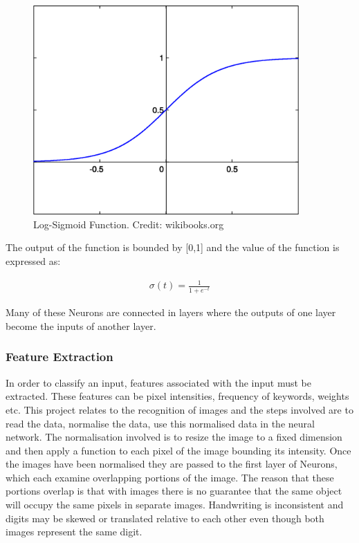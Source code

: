 \documentclass[12pt]{article}
\begin{document}
\begin{figure}[H]
  \centering
  \includegraphics[width=4in]{SigmoidFunction}
  \caption[]{Log-Sigmoid Function. Credit: wikibooks.org}
  \label{SigmoidFunction}
\end{figure}

The output of the function is bounded by [0,1] and the value of the function is expressed as:

\begin{align*}
\sigma(t) = \frac{1}{1 + e^{-t}}
\end{align*}

Many of these Neurons are connected in layers where the outputs of one layer become the inputs of another layer.

\subsubsection{Feature Extraction}
In order to classify an input, features associated with the input must be extracted. These features can be pixel intensities, frequency of keywords, weights etc. This project relates to the recognition of images and the steps involved are to read the data, normalise the data, use this normalised data in the neural network. The normalisation involved is to resize the image to a fixed dimension and then apply a function to each pixel of the image bounding its intensity.
\newline
\newline
Once the images have been normalised they are passed to the first layer of Neurons, which each examine overlapping portions of the image. The reason that these portions overlap is that with images there is no guarantee that the same object will occupy the same pixels in separate images. Handwriting is inconsistent and digits may be skewed or translated relative to each other even though both images represent the same digit.
\end{document}
